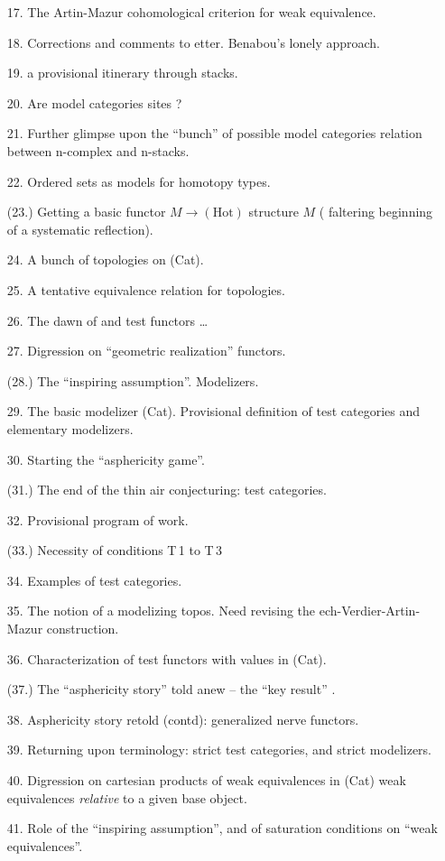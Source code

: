 \documentclass[11pt,a4paper]{article}
\begin{document}
\begin{itemize}
  \item[17.] The Artin-Mazur cohomological criterion for weak equivalence.
  \item[18.] Corrections and comments to etter. Benabou's lonely approach.
  \item[19.]   a provisional itinerary \add{(}through stacks\add{)}.
  \item[20.] Are model categories sites ?
  \item[21.] Further glimpse upon the ``bunch'' of possible model categories\add{;}   relation between n-complex and n-stacks.
  \item[22.] Ordered sets as models for homotopy types.
  \item[(23.)] Getting a basic functor $M\to(\mathrm{Hot})$ \struck{\ill{}}  structure $M$ ( faltering beginning of a systematic reflection).
  \item[24.] A bunch of topologies on (Cat).
  \item[25.] A tentative equivalence relation for topologies.
  \item[26.] The dawn of \struck{\ill{}}  and test functors …
  \item[27.] Digression on ``geometric realization'' functors.
  \item[(28.)] The ``inspiring assumption''. Modelizers.
  \item[29.] The basic modelizer (Cat). Provisional definition of test categories and elementary modelizers.
  \item[30.] Starting  the ``asphericity game''.
  \item[(31.)] The end of the thin air conjecturing:   test categories.
  \item[32.] Provisional program of work.
  \item[(33.)] Necessity of conditions T\,1 to T\,3 
  \item[34.] Examples of test categories.
  \item[35.] The notion of a modelizing topos. Need   revising the ech-Verdier-Artin-Mazur construction.
  \item[36.] Characterization of  test functors with values in (Cat).
  \item[(37.)] The ``asphericity story'' told anew -- the ``key result'' . 
  \item[38.] Asphericity story retold (contd): generalized nerve functors.
  \item[39.] Returning upon terminology: strict test categories, and strict modelizers.
  \item[40.] Digression on cartesian products of weak equivalences in (Cat)\add{;} weak equivalences \emph{relative} to a given base object.
  \item[41.] Role of the ``inspiring assumption'', and of saturation conditions on ``weak equivalences''.
\end{itemize}
\end{document}
